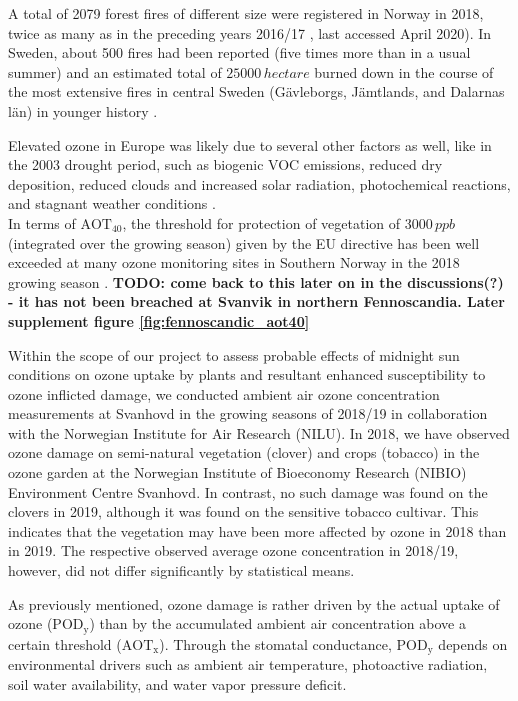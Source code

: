 \documentclass[bg, manuscript]{copernicus}
\begin{document}
A total of 2079 forest fires of different size were registered in Norway in 2018, twice as many as in the preceding years 2016/17 \citep{DSB2019}, last accessed April 2020). In Sweden, about 500 fires had been reported (five times more than in a usual summer) and an estimated total of $25000\,\unit{hectare}$ burned down in the course of the most extensive fires in central Sweden (G\"{a}vleborgs, J\"{a}mtlands, and Dalarnas l\"{a}n) in younger history \citep{SOU2019}.

Elevated ozone in Europe was likely due to several other factors as well, like in the 2003 drought period, such as biogenic VOC emissions, reduced dry deposition, reduced clouds and increased solar radiation, photochemical reactions, and stagnant weather conditions \citep{JGR:Solberg2018}.\\

In terms of $\mathrm{AOT_{40}}$, the threshold for protection of vegetation of $3000\,\unit{ppb}$ (integrated over the growing season) given by the EU directive has been well exceeded at many ozone monitoring sites in Southern Norway in the 2018 growing season \citep{NILU2019}. {\bf TODO: come back to this later on in the discussions(?) - it has not been breached at Svanvik in northern Fennoscandia. Later supplement figure \ref{fig:fennoscandic_aot40}}

Within the scope of our project to assess probable effects of midnight sun conditions on ozone uptake by plants and resultant enhanced susceptibility to ozone inflicted damage, we conducted ambient air ozone concentration measurements at Svanhovd in the growing seasons of 2018/19 in collaboration with the Norwegian Institute for Air Research (NILU). 
In 2018, we have observed ozone damage on semi-natural vegetation (clover) and crops (tobacco) in the ozone garden at the Norwegian Institute of Bioeconomy Research (NIBIO) Environment Centre Svanhovd. In contrast, no such damage was found on the clovers in 2019, although it was found on the sensitive tobacco cultivar. This indicates that the vegetation may have been more affected by ozone in 2018 than in 2019.
The respective observed average ozone concentration in 2018/19, however, did not differ significantly by statistical means.

As previously mentioned, ozone damage is rather driven by the actual uptake of ozone ($\mathrm{POD_y}$) than by the accumulated ambient air concentration above a certain threshold ($\mathrm{AOT_x}$). Through the stomatal conductance, $\mathrm{POD_y}$ depends on environmental drivers such as ambient air temperature, photoactive radiation, soil water availability, and water vapor pressure deficit.
\end{document}
